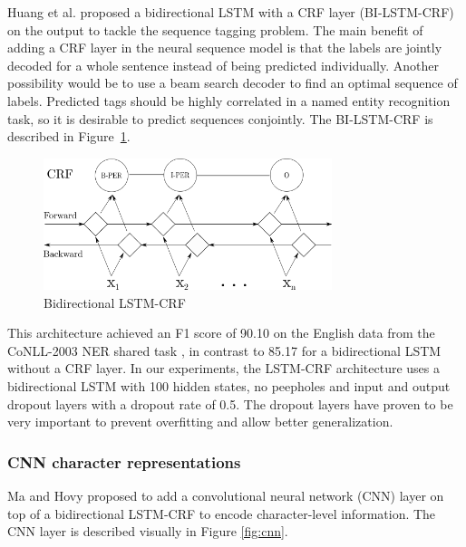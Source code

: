\documentclass{nle}
\begin{document}
Huang et al. \cite{Huang2015} proposed a bidirectional LSTM with a CRF layer (BI-LSTM-CRF) on 
the output to tackle the sequence tagging problem. The main benefit of adding a CRF layer 
in the neural sequence model is that the labels are jointly decoded for a whole sentence 
instead of being predicted individually. Another possibility would be to use a beam search
decoder to find an optimal sequence of labels. Predicted tags should be highly correlated 
in a named entity recognition task, so it is desirable to predict sequences conjointly.
The BI-LSTM-CRF is described in Figure~\ref{fig:bi_lstm_crf}.

\begin{figure}[h]
  \centering
  \includegraphics[width=0.75\textwidth]{pics/bi_lstm_crf}
  \caption{Bidirectional LSTM-CRF}
  \label{fig:bi_lstm_crf}
\end{figure}

This architecture achieved an F1 score of 90.10 on the English data from the CoNLL-2003 
NER shared task \cite{KimSang2003}, in contrast to 85.17 for a bidirectional LSTM without 
a CRF layer. 
In our experiments, the LSTM-CRF architecture uses a bidirectional LSTM with 100 
hidden states, no peepholes and input and output dropout layers with a dropout
rate of 0.5. The dropout layers have proven to be very important to prevent overfitting 
and allow better generalization.

\subsubsection{CNN character representations}
\label{sssec:lstm_crf_cnn}

Ma and Hovy \cite{Ma2016} proposed to add a convolutional neural network (CNN) layer 
on top of a bidirectional LSTM-CRF to encode character-level information. The CNN
layer is described visually in Figure \ref{fig:cnn}.
\end{document}
